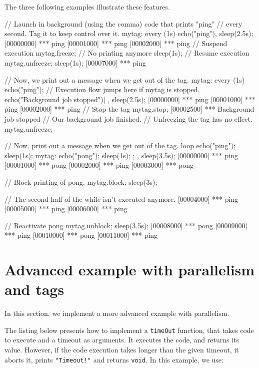 The three following examples illustrate these features.

\begin{urbiscript}[firstnumber=1]
// Launch in background (using the comma) code that prints "ping"
// every second.  Tag it to keep control over it.
mytag:
  every (1s)
    echo("ping"),
sleep(2.5s);
[00000000] *** ping
[00001000] *** ping
[00002000] *** ping
// Suspend execution
mytag.freeze;
// No printing anymore
sleep(1s);
// Resume execution
mytag.unfreeze;
sleep(1s);
[00007000] *** ping
\end{urbiscript}

\begin{urbiscript}[firstnumber=1]
// Now, we print out a message when we get out of the tag.
{
  mytag:
    every (1s)
      echo("ping");
  // Execution flow jumps here if mytag is stopped.
  echo("Background job stopped")|
},
sleep(2.5s);
[00000000] *** ping
[00001000] *** ping
[00002000] *** ping
// Stop the tag
mytag.stop;
[00002500] *** Background job stopped
// Our background job finished.
// Unfreezing the tag has no effect.
mytag.unfreeze;
\end{urbiscript}

\begin{urbiscript}[firstnumber=1]
// Now, print out a message when we get out of the tag.
loop
{
  echo("ping"); sleep(1s);
  mytag: { echo("pong"); sleep(1s); };
},
sleep(3.5s);
[00000000] *** ping
[00001000] *** pong
[00002000] *** ping
[00003000] *** pong

// Block printing of pong.
mytag.block;
sleep(3s);

// The second half of the while isn't executed anymore.
[00004000] *** ping
[00005000] *** ping
[00006000] *** ping

// Reactivate pong
mytag.unblock;
sleep(3.5s);
[00008000] *** pong
[00009000] *** ping
[00010000] *** pong
[00011000] *** ping
\end{urbiscript}

\section{Advanced example with parallelism and tags}

In this section, we implement a more advanced example with
parallelism.

The listing below presents how to implement a \lstinline{timeOut}
function, that takes code to execute and a timeout as arguments. It
executes the code, and returns its value. However, if the code
execution takes longer than the given timeout, it aborts it, prints
\lstinline|"Timeout!"| and returns \lstinline|void|. In this example, we use:

